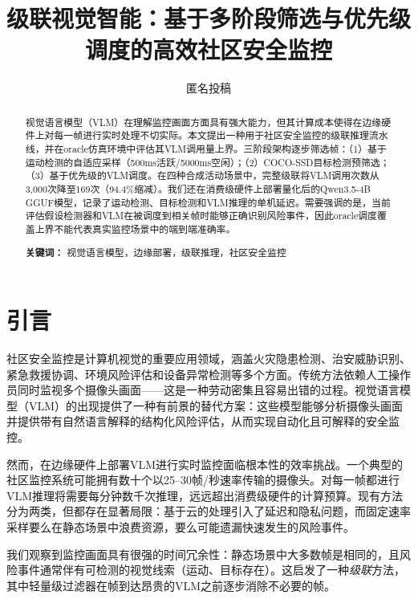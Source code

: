 \documentclass[a4paper,10pt]{ctexart}
\title{\heiti\Large 级联视觉智能：基于多阶段筛选与优先级调度的高效社区安全监控}
\author{匿名投稿}
\date{}
\begin{document}
\maketitle

\begin{abstract}
视觉语言模型（VLM）在理解监控画面方面具有强大能力，但其计算成本使得在边缘硬件上对每一帧进行实时处理不切实际。本文提出一种用于社区安全监控的级联推理流水线，并在oracle仿真环境中评估其VLM调用量上界。三阶段架构逐步筛选帧：（1）基于运动检测的自适应采样（500ms活跃/5000ms空闲）；（2）COCO-SSD目标检测预筛选；（3）基于优先级的VLM调度。在四种合成活动场景中，完整级联将VLM调用次数从3,000次降至169次（94.4\%缩减）。我们还在消费级硬件上部署量化后的Qwen3.5-4B GGUF模型，记录了运动检测、目标检测和VLM推理的单机延迟。需要强调的是，当前评估假设检测器和VLM在被调度到相关帧时能够正确识别风险事件，因此oracle调度覆盖上界不能代表真实监控场景中的端到端准确率。

\noindent\textbf{关键词：} 视觉语言模型，边缘部署，级联推理，社区安全监控
\end{abstract}

\section{引言}

社区安全监控是计算机视觉的重要应用领域，涵盖火灾隐患检测、治安威胁识别、紧急救援协调、环境风险评估和设备异常检测等多个方面。传统方法依赖人工操作员同时监视多个摄像头画面——这是一种劳动密集且容易出错的过程。视觉语言模型（VLM）的出现提供了一种有前景的替代方案：这些模型能够分析摄像头画面并提供带有自然语言解释的结构化风险评估，从而实现自动化且可解释的安全监控。

然而，在边缘硬件上部署VLM进行实时监控面临根本性的效率挑战。一个典型的社区监控系统可能拥有数十个以25--30帧/秒速率传输的摄像头。对每一帧都进行VLM推理将需要每分钟数千次推理，远远超出消费级硬件的计算预算。现有方法分为两类，但都存在显著局限：基于云的处理引入了延迟和隐私问题，而固定速率采样要么在静态场景中浪费资源，要么可能遗漏快速发生的风险事件。

我们观察到监控画面具有很强的时间冗余性：静态场景中大多数帧是相同的，且风险事件通常伴有可检测的视觉线索（运动、目标存在）。这启发了一种\textit{级联}方法，其中轻量级过滤器在帧到达昂贵的VLM之前逐步消除不必要的帧。
\end{document}

